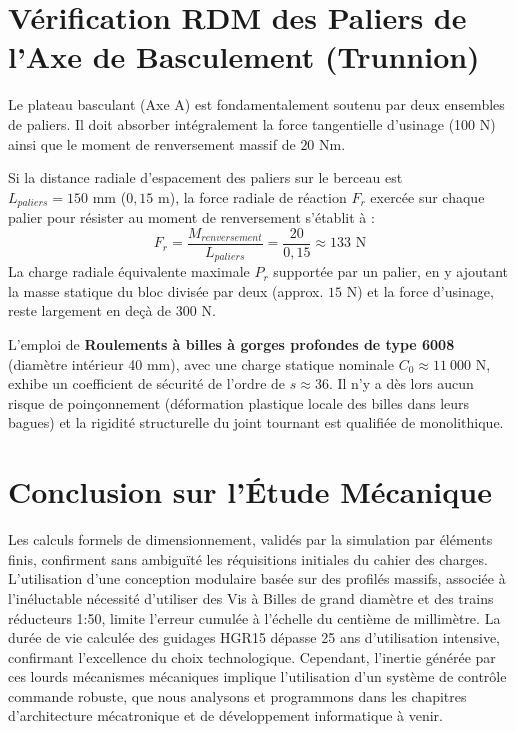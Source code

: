 \section{Vérification RDM des Paliers de l'Axe de Basculement (Trunnion)}
Le plateau basculant (Axe A) est fondamentalement soutenu par deux ensembles de paliers. Il doit absorber intégralement la force tangentielle d'usinage (100 N) ainsi que le moment de renversement massif de $20\text{ Nm}$.

Si la distance radiale d'espacement des paliers sur le berceau est $L_{paliers} = 150\text{ mm}$ ($0{,}15\text{ m}$), la force radiale de réaction $F_r$ exercée sur chaque palier pour résister au moment de renversement s'établit à :
\begin{equation}
    F_r = \frac{M_{renversement}}{L_{paliers}} = \frac{20}{0{,}15} \approx \boxed{133 \text{ N}}
\end{equation}
La charge radiale équivalente maximale $P_r$ supportée par un palier, en y ajoutant la masse statique du bloc divisée par deux (approx. $15\text{ N}$) et la force d'usinage, reste largement en deçà de $300\text{ N}$.

L'emploi de \textbf{Roulements à billes à gorges profondes de type 6008} (diamètre intérieur 40 mm), avec une charge statique nominale $C_0 \approx 11~000\text{ N}$, exhibe un coefficient de sécurité de l'ordre de $s \approx 36$. Il n'y a dès lors aucun risque de poinçonnement (déformation plastique locale des billes dans leurs bagues) et la rigidité structurelle du joint tournant est qualifiée de monolithique.

\section{Conclusion sur l'Étude Mécanique}
Les calculs formels de dimensionnement, validés par la simulation par éléments finis, confirment sans ambiguïté les réquisitions initiales du cahier des charges. L'utilisation d'une conception modulaire basée sur des profilés massifs, associée à l'inéluctable nécessité d'utiliser des Vis à Billes de grand diamètre et des trains réducteurs 1:50, limite l'erreur cumulée à l'échelle du centième de millimètre. La durée de vie calculée des guidages HGR15 dépasse 25 ans d'utilisation intensive, confirmant l'excellence du choix technologique.
Cependant, l'inertie générée par ces lourds mécanismes mécaniques implique l'utilisation d'un système de contrôle commande robuste, que nous analysons et programmons dans les chapitres d'architecture mécatronique et de développement informatique à venir.
